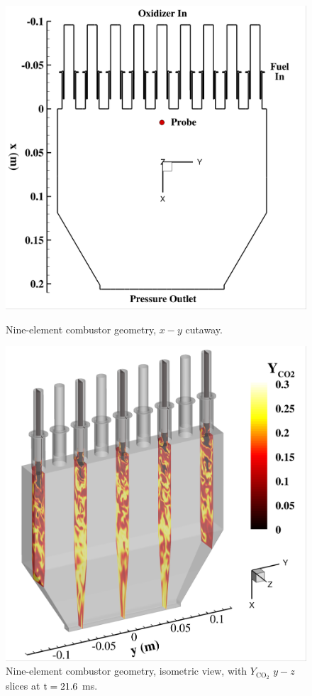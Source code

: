 \begin{figure}
	\begin{minipage}{0.49\linewidth}
		\includegraphics[width=0.99\linewidth]{Chapters/HPROMResults/Images/nineElem/geom_xy.png}
		\caption{\label{fig:nineElemGeomXY}Nine-element combustor geometry, $x-y$ cutaway.}
	\end{minipage}
	\begin{minipage}{0.49\linewidth}
		\includegraphics[width=0.99\linewidth]{Chapters/HPROMResults/Images/nineElem/geom_iso.png}
		\caption{\label{fig:nineElemGeomIso}Nine-element combustor geometry, isometric view, with $Y_{\text{CO}_2}$ $y-z$ slices at $\text{t} = 21.6$ ms.}
	\end{minipage}
\end{figure}

